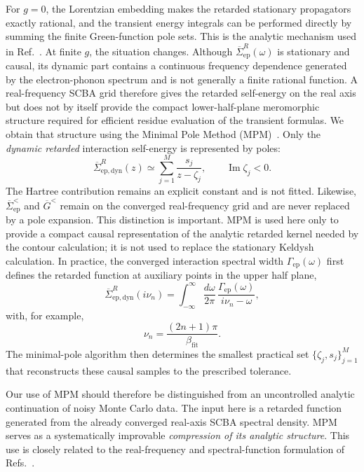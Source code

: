 \documentclass[
 reprint,
 superscriptaddress,
 amsmath,amssymb,
 aps,prb,
 longbibliography,
 floatfix
]{revtex4-2}
\newcommand{\ep}{\mathrm{ep}}
\newcommand{\barSigma}{\overline{\Sigma}}
\begin{document}
For $g=0$, the Lorentzian embedding makes the retarded stationary propagators exactly rational, and the transient energy integrals can be performed directly by summing the finite Green-function pole sets. This is the analytic mechanism used in Ref.~\cite{MaciejkoWangGuo2006}. At finite $g$, the situation changes. Although $\barSigma_{\ep}^R(\omega)$ is stationary and causal, its dynamic part contains a continuous frequency dependence generated by the electron-phonon spectrum and is not generally a finite rational function. A real-frequency SCBA grid therefore gives the retarded self-energy on the real axis but does not by itself provide the compact lower-half-plane meromorphic structure required for efficient residue evaluation of the transient formulas. We obtain that structure using the Minimal Pole Method (MPM)~\cite{ZhangYuGull2024, ZhangErpenbeckYuGull2025}. Only the \emph{dynamic retarded} interaction self-energy is represented by poles:
\begin{equation}
\barSigma_{\ep,\mathrm{dyn}}^R(z)
\simeq
\sum_{j=1}^{M}
\frac{s_j}{z-\zeta_j},
\qquad
\operatorname{Im}\zeta_j<0.
\label{eq:mpm}
\end{equation}
The Hartree contribution remains an explicit constant and is not fitted. Likewise, $\barSigma_{\ep}^<$ and $\overline G^<$ remain on the converged real-frequency grid and are never replaced by a pole expansion. This distinction is important. MPM is used here only to provide a compact causal representation of the analytic retarded kernel needed by the contour calculation; it is not used to replace the stationary Keldysh calculation. In practice, the converged interaction spectral width $\Gamma_{\ep}(\omega)$  first defines the retarded function at auxiliary points in the upper half plane,
\begin{equation*}
\barSigma_{\ep,\mathrm{dyn}}^R(i\nu_n)
=
\int_{-\infty}^{\infty}
\frac{d\omega}{2\pi}\,
\frac{
\Gamma_{\ep}(\omega)
}{
i\nu_n-\omega
},
\end{equation*}
with, for example,
\begin{equation*}
\nu_n
=
\frac{(2n+1)\pi}{\beta_{\mathrm{fit}}}.
\end{equation*}
The minimal-pole algorithm then determines the smallest practical set $\{\zeta_j,s_j\}_{j=1}^{M}$ that reconstructs these causal samples to the prescribed tolerance.

Our use of MPM should therefore be distinguished from an uncontrolled analytic continuation of noisy Monte Carlo data. The input here is a retarded function generated from the already converged real-axis SCBA spectral density. MPM serves as a systematically improvable \emph{compression of its analytic structure}. This use is closely related to the real-frequency and spectral-function formulation of Refs.~\cite{ZhangErpenbeckYuGull2025}.
\end{document}
